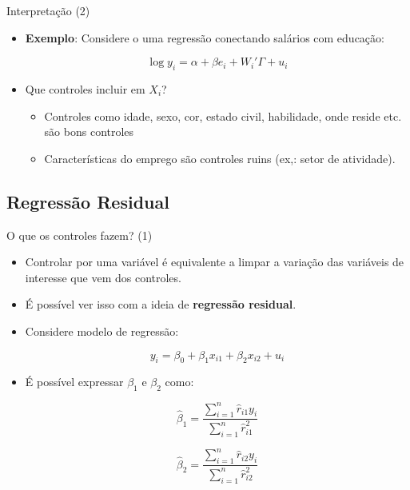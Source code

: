 \documentclass[10pt,slides,xcolor=pdftex,dvipsnames,table]{beamer}
\begin{document}

\begin{frame}{Interpretação (2)}
    
     \begin{itemize}\itemsep1.2em   
     
     \item \textbf{Exemplo}: Considere o uma regressão conectando salários com educação:
     
     $$ \log y_i = \alpha + \beta e_i + W_i' \Gamma + u_i $$
     
     \item Que controles incluir em $X_i$? 
     \begin{itemize}
     \item Controles como idade, sexo, cor, estado civil, habilidade, onde reside etc. são bons controles
     \item Características do emprego são controles ruins (ex,: setor de atividade). 
     \end{itemize}     
     
    \end{itemize}
    
\end{frame}


\subsection{Regressão Residual}


\begin{frame}{O que os controles fazem? (1)}
    
     \begin{itemize}\itemsep1.2em   
     
     \item Controlar por uma variável é equivalente a limpar a variação das variáveis de interesse que vem dos controles. 
     
     \item É possível ver isso com a ideia de \textbf{regressão residual}. 
     
     \item Considere modelo de regressão:
     
     $$ y_i = \beta_0 + \beta_1 x_{i1} + \beta_2 x_{i2} + u_i $$
     
     \item É possível expressar $\beta_1$ e $\beta_2$ como: 
     
     $$ \widehat{\beta}_1 = \frac{\sum_{i=1}^n \widehat{r}_{i1} y_i}{\sum_{i=1}^n \widehat{r}_{i1}^2}$$       
     
     $$ \widehat{\beta}_2 = \frac{\sum_{i=1}^n \widehat{r}_{i2} y_i}{\sum_{i=1}^n \widehat{r}_{i2}^2}$$       
     
    \end{itemize}
    
\end{frame}
\end{document}
